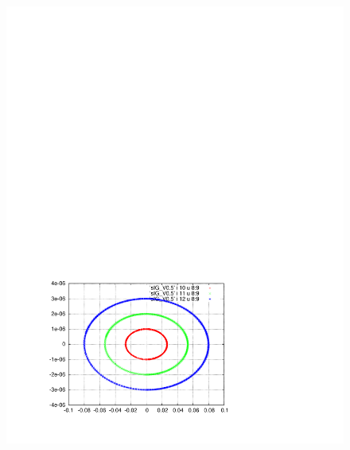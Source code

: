 \documentclass[]{article}
\begin{document}
\begin{figure}[h]
\begin{minipage}[b]{0.45\linewidth}
\includegraphics[scale=0.6]{pdf/delta_vs_ct_V0p5.pdf}
\end{minipage}
%
%
\begin{minipage}[b]{0.45\linewidth}
\centering

\end{minipage}
\end{figure}
\end{document}
